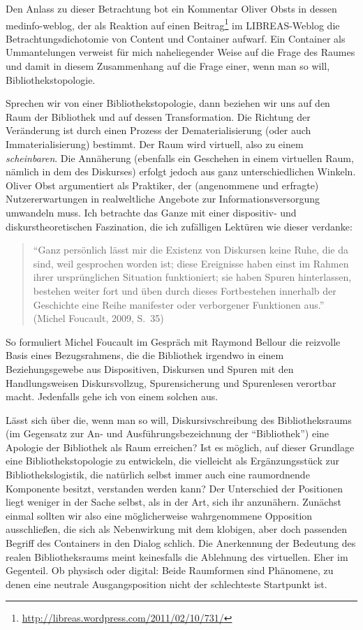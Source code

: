 \documentclass[output=paper]{langscibook}
\begin{document}
Den Anlass zu dieser Betrachtung bot ein Kommentar Oliver Obsts in
dessen medinfo-weblog, der als Reaktion auf einen Beitrag\footnote{\url{http://libreas.wordpress.com/2011/02/10/731/}}
im LIBREAS-Weblog die Betrachtungsdichotomie von Content und Container
aufwarf. Ein Container als Ummantelungen verweist für mich naheliegender
Weise auf die Frage des Raumes und damit in diesem Zusammenhang auf die
Frage einer, wenn man so will, Bibliothekstopologie.

Sprechen wir von einer Bibliothekstopologie, dann beziehen wir uns auf
den Raum der Bibliothek und auf dessen Transformation. Die Richtung der
Veränderung ist durch einen Prozess der Dematerialisierung (oder auch
Immaterialisierung) bestimmt. Der Raum wird virtuell, also zu einem
\emph{scheinbaren}. Die Annäherung (ebenfalls ein Geschehen in einem
virtuellen Raum, nämlich in dem des Diskurses) erfolgt jedoch aus ganz
unterschiedlichen Winkeln. Oliver Obst argumentiert als Praktiker, der
(angenommene und erfragte) Nutzererwartungen in realweltliche Angebote
zur Informationsversorgung umwandeln muss. Ich betrachte das Ganze mit
einer dispositiv- und diskurstheoretischen Faszination, die ich
zufälligen Lektüren wie dieser verdanke:

\begin{quote}
\enquote{Ganz persönlich lässt mir die Existenz von Diskursen keine
Ruhe, die da sind, weil gesprochen worden ist; diese Ereignisse haben
einst im Rahmen ihrer ursprünglichen Situation funktioniert; sie haben
Spuren hinterlassen, bestehen weiter fort und üben durch dieses
Fortbestehen innerhalb der Geschichte eine Reihe manifester oder
verborgener Funktionen aus.} (Michel Foucault, 2009, S.~35)
\end{quote}

\noindent So formuliert Michel Foucault im Gespräch mit Raymond Bellour die
reizvolle Basis eines Bezugsrahmens, die die Bibliothek irgendwo in
einem Beziehungsgewebe aus Dispositiven, Diskursen und Spuren mit den
Handlungsweisen Diskursvollzug, Spurensicherung und Spurenlesen
verortbar macht. Jedenfalls gehe ich von einem solchen aus.

Lässt sich über die, wenn man so will, Diskursivschreibung des
Bibliotheksraums (im Gegensatz zur An- und Ausführungsbezeichnung der
\enquote{Bibliothek}) eine Apologie der Bibliothek als Raum erreichen?
Ist es möglich, auf dieser Grundlage eine Bibliothekstopologie zu
entwickeln, die vielleicht als Ergänzungsstück zur Bibliothekslogistik,
die natürlich selbst immer auch eine raumordnende Komponente besitzt,
verstanden werden kann? Der Unterschied der Positionen liegt weniger in
der Sache selbst, als in der Art, sich ihr anzunähern. Zunächst einmal
sollten wir also eine möglicherweise wahrgenommene Opposition
ausschließen, die sich als Nebenwirkung mit dem klobigen, aber doch
passenden Begriff des Containers in den Dialog schlich. Die Anerkennung
der Bedeutung des realen Bibliotheksraums meint keinesfalls die
Ablehnung des virtuellen. Eher im Gegenteil. Ob physisch oder digital:
Beide Raumformen sind Phänomene, zu denen eine neutrale Ausgangsposition
nicht der schlechteste Startpunkt ist.
\end{document}
